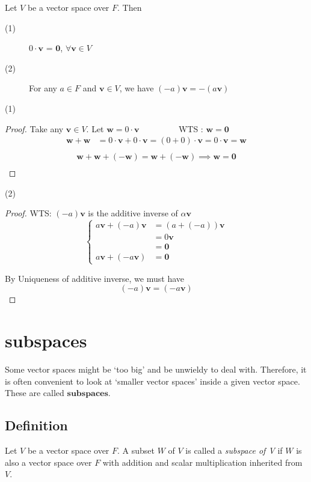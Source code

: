\documentclass[12pt]{article}
\begin{document}
Let $V$ be a vector space over $F$. Then
\begin{description}

\item[(1)] $0 \cdot \mathbf{v}$ = $\mathbf{0}$, $\forall \mathbf{v} \in V$   
\item[(2)] For any $a \in F$ and $\mathbf{v} \in V$, we have $(-a)\mathbf{v} = -(a\mathbf{v})$

\end{description}
(1)
\begin{proof}
Take any $\mathbf{v} \in V$. Let $\mathbf{w} = 0 \cdot \mathbf{v}$  $\qquad\qquad$ WTS : $\mathbf{w} = \mathbf{0}$
\[
\begin{aligned}
\mathbf{w} + \mathbf{w}
&= 0 \cdot \mathbf{v} + 0 \cdot \mathbf{v} = (0 + 0) \cdot \mathbf{v} = 0 \cdot \mathbf{v} = \mathbf{w}\\
\end{aligned}
\]
\[
\begin{aligned}
\mathbf{w} + \mathbf{w} + \mathbf{(-w)} = \mathbf{w} + \mathbf{(-w)} \implies \mathbf{w} = \mathbf{0}\\
\end{aligned}
\]

\end{proof}

(2) 
\begin{proof}
WTS: $(-a)\mathbf{v}$ is the additive inverse of $\alpha\mathbf{v}$
\[
\left\{
\begin{aligned}
a\mathbf{v} + (-a)\mathbf{v}
&= (a + (-a))\mathbf{v}\\
&= 0\mathbf{v}\\ 
&= \mathbf{0}\\
a\mathbf{v} + (-a\mathbf{v}) &= \mathbf{0}    
\end{aligned}
\right.
\]

By Uniqueness of additive inverse, we must have
\[
(-a)\mathbf{v} = (-a\mathbf{v})
\]
\end{proof}

\section{subspaces}
Some vector spaces might be ‘too big’ and be unwieldy to deal with. Therefore, it is often
convenient to look at ‘smaller vector spaces’ inside a given vector space. These are called
$\textbf{subspaces}$.

\subsection{Definition}
Let $V$ be a vector space over $F$. A subset $W$ of $V$ is called a \emph{subspace of V} if $W$ is also a vector space over $F$ with addition and scalar multiplication inherited from $V$.
\end{document}
